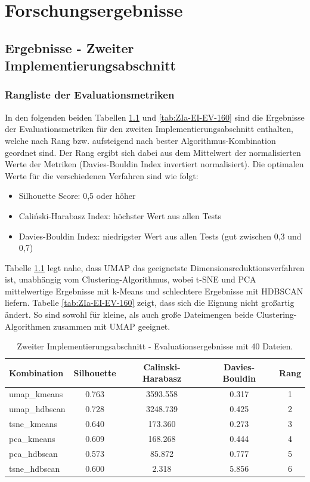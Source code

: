 \chapter{Forschungsergebnisse}

\section{Ergebnisse - Zweiter Implementierungsabschnitt}
\subsection{Rangliste der Evaluationsmetriken}
In den folgenden beiden Tabellen \ref{tab:ZIa-EI-EV-20} und \ref{tab:ZIa-EI-EV-160} sind die Ergebnisse der Evaluationsmetriken für den zweiten Implementierungsabschnitt enthalten, welche nach Rang bzw. aufsteigend nach bester Algorithmus-Kombination geordnet sind. Der Rang ergibt sich dabei aus dem Mittelwert der normalisierten Werte der Metriken (Davies-Bouldin Index invertiert normalisiert). Die optimalen Werte für die verschiedenen Verfahren sind wie folgt:
\begin{itemize}
    \item Silhouette Score: 0,5 oder höher
    \item Caliński-Harabasz Index: höchster Wert aus allen Tests
    \item Davies-Bouldin Index: niedrigster Wert aus allen Tests (gut zwischen 0,3 und 0,7)
\end{itemize}
Tabelle \ref{tab:ZIa-EI-EV-20} legt nahe, dass UMAP das geeignetste Dimensionsreduktionsverfahren ist, unabhängig vom Clustering-Algorithmus, wobei t-SNE und PCA mittelwertige Ergebnisse mit k-Means und schlechtere Ergebnisse mit HDBSCAN liefern.
Tabelle \ref{tab:ZIa-EI-EV-160} zeigt, dass sich die Eignung nicht großartig ändert. So sind sowohl für kleine, als auch große Dateimengen beide Clustering-Algorithmen zusammen mit UMAP geeignet.

\setlength{\tabcolsep}{5.5pt}
\begin{table}[h]
\centering
\begin{tabular}{lcccc}
\hline
\textbf{Kombination} & \textbf{Silhouette} & \textbf{Calinski-Harabasz} & \textbf{Davies-Bouldin} & \textbf{Rang} \\
\hline
umap\_kmeans    & 0.763 & 3593.558 & 0.317 & 1 \\
umap\_hdbscan   & 0.728 & 3248.739 & 0.425 & 2 \\
tsne\_kmeans    & 0.640 & 173.360  & 0.273 & 3 \\
pca\_kmeans     & 0.609 & 168.268  & 0.444 & 4 \\
pca\_hdbscan    & 0.573 & 85.872   & 0.777 & 5 \\
tsne\_hdbscan   & 0.600 & 2.318    & 5.856 & 6 \\
\hline
\end{tabular}
\caption{Zweiter Implementierungsabschnitt - Evaluationsergebnisse mit 40 Dateien.}
\label{tab:ZIa-EI-EV-20}
\end{table}

